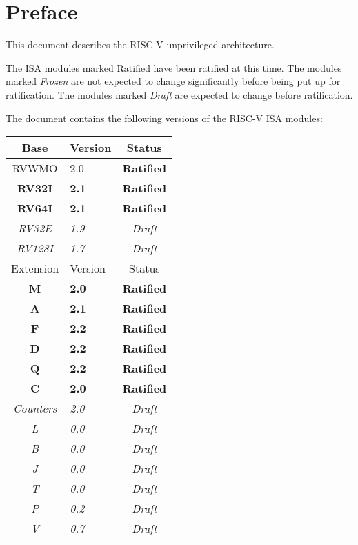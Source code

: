 \chapter{Preface}

This document describes the RISC-V unprivileged architecture.

The ISA modules marked Ratified have been ratified at this time.  The modules
marked {\em Frozen} are not expected to change significantly before being put
up for ratification.  The modules marked {\em Draft} are expected to change
before ratification.

The document contains the following versions of the RISC-V ISA modules:

{
\begin{table}[hbt]
  \centering
  \begin{tabular}{|c|l|c|}
    \hline
    Base           & Version & Status\\
    \hline
    RVWMO          & 2.0 & \bf Ratified   \\
    \bf RV32I      & \bf 2.1 & \bf Ratified \\
    \bf RV64I      & \bf 2.1 & \bf Ratified \\
    \em RV32E      & \em 1.9 & \em Draft \\
    \em RV128I     & \em 1.7 & \em Draft \\
    \hline
    Extension      & Version & Status \\
    \hline
    \bf M          & \bf 2.0 & \bf Ratified \\
    \bf A          & \bf 2.1 & \bf Ratified \\
    \bf F          & \bf 2.2 & \bf Ratified \\
    \bf D          & \bf 2.2 & \bf Ratified \\
    \bf Q          & \bf 2.2 & \bf Ratified \\
    \bf C          & \bf 2.0 & \bf Ratified \\
    \em Counters   & \em 2.0 & \em Draft \\
    \em L          & \em 0.0 & \em Draft \\
    \em B          & \em 0.0 & \em Draft \\
    \em J          & \em 0.0 & \em Draft \\
    \em T          & \em 0.0 & \em Draft \\
    \em P          & \em 0.2 & \em Draft \\
    \em V          & \em 0.7 & \em Draft \\

\end{tabular}
\end{table}}

